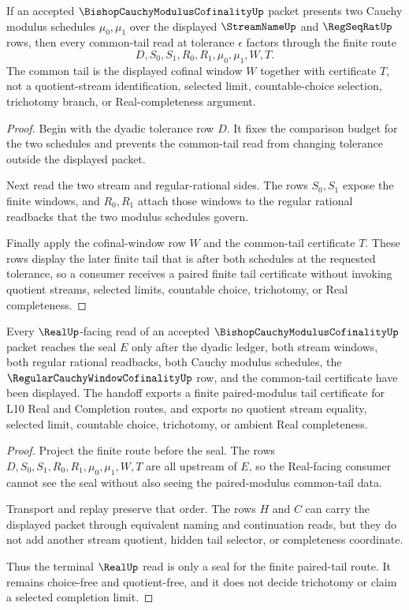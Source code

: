 \begin{theorem}
\label{thm:bishop-cauchy-modulus-cofinality-common-tail}
If an accepted $\BishopCauchyModulusCofinalityUp$ packet presents two Cauchy modulus schedules $\mu_0,\mu_1$ over the displayed $\StreamNameUp$ and $\RegSeqRatUp$ rows, then every common-tail read at tolerance $\epsilon$ factors through the finite route
$$
D,S_0,S_1,R_0,R_1,\mu_0,\mu_1,W,T.
$$
The common tail is the displayed cofinal window $W$ together with certificate $T$, not a quotient-stream identification, selected limit, countable-choice selection, trichotomy branch, or Real-completeness argument.
\end{theorem}
\begin{proof}
Begin with the dyadic tolerance row $D$. It fixes the comparison budget for the two schedules and prevents the common-tail read from changing tolerance outside the displayed packet.

Next read the two stream and regular-rational sides. The rows $S_0,S_1$ expose the finite windows, and $R_0,R_1$ attach those windows to the regular rational readbacks that the two modulus schedules govern.

Finally apply the cofinal-window row $W$ and the common-tail certificate $T$. These rows display the later finite tail that is after both schedules at the requested tolerance, so a consumer receives a paired finite tail certificate without invoking quotient streams, selected limits, countable choice, trichotomy, or Real completeness.
\end{proof}

\begin{theorem}
\label{thm:bishop-cauchy-modulus-cofinality-real-seal-handoff}
Every $\RealUp$-facing read of an accepted $\BishopCauchyModulusCofinalityUp$ packet reaches the seal $E$ only after the dyadic ledger, both stream windows, both regular rational readbacks, both Cauchy modulus schedules, the $\RegularCauchyWindowCofinalityUp$ row, and the common-tail certificate have been displayed. The handoff exports a finite paired-modulus tail certificate for L10 Real and Completion routes, and exports no quotient stream equality, selected limit, countable choice, trichotomy, or ambient Real completeness.
\end{theorem}
\begin{proof}
Project the finite route before the seal. The rows $D,S_0,S_1,R_0,R_1,\mu_0,\mu_1,W,T$ are all upstream of $E$, so the Real-facing consumer cannot see the seal without also seeing the paired-modulus common-tail data.

Transport and replay preserve that order. The rows $H$ and $C$ can carry the displayed packet through equivalent naming and continuation reads, but they do not add another stream quotient, hidden tail selector, or completeness coordinate.

Thus the terminal $\RealUp$ read is only a seal for the finite paired-tail route. It remains choice-free and quotient-free, and it does not decide trichotomy or claim a selected completion limit.
\end{proof}

